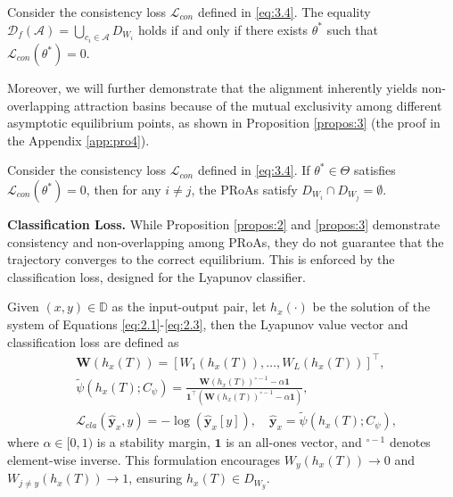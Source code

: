 \documentclass[journal]{IEEEtran}
\begin{document}
\begin{proposition} \label{propos:2}
	Consider the consistency loss $\mathcal{L}_{con}$ defined in \eqref{eq:3.4}. The equality $\mathcal{D}_{f}(\mathcal{A}) = \bigcup_{c_i \in \mathcal{A}} D_{W_i}$ holds if and only if there exists $\theta^*$ such that $\mathcal{L}_{con}(\theta^*) = 0$.
\end{proposition}

Moreover, we will further demonstrate that the alignment inherently yields non-overlapping attraction basins because of the mutual exclusivity among different asymptotic equilibrium points, as shown in Proposition \ref{propos:3} (the proof in the Appendix \ref{app:pro4}).

\begin{proposition} \label{propos:3}
	Consider the consistency loss $\mathcal{L}_{con}$ defined in \eqref{eq:3.4}. If $\theta^* \in \Theta$ satisfies $\mathcal{L}_{con}(\theta^*) = 0$, then for any $i \neq j$, the PRoAs satisfy $D_{W_i} \cap D_{W_j} = \emptyset$.
\end{proposition}

\vspace{\baselineskip} 
\noindent  \textbf{Classification Loss.} 
While Proposition \ref{propos:2} and \ref{propos:3} demonstrate consistency and non-overlapping among PRoAs, they do not guarantee that the trajectory converges to the correct equilibrium. This is enforced by the classification loss, designed for the Lyapunov classifier. 

Given $(x,y) \in \mathbb{D}$ as the input-output pair, let $h_x( \cdot)$ be the solution of the system of Equations \eqref{eq:2.1}-\eqref{eq:2.3}, then the Lyapunov value vector and classification loss are defined as
\begin{align*}
	& \mathbf{W}(h_x(T)) = \left[ W_1(h_x(T)), \dots, W_L(h_x(T)) \right]^\top ,\\
	& \tilde \psi \left( {{h_x}\left( T \right);{C_\psi }} \right) = \frac{ \mathbf{W}(h_x(T))^{\circ -1} - \alpha \mathbf{1} }{ \mathbf{1}^\top \left( \mathbf{W}(h_x(T))^{\circ -1} - \alpha \mathbf{1} \right) } ,\\
	& \mathcal{L}_{cla}(\hat{\mathbf{y}}_x, y) = -\log \left( \hat{\mathbf{y}}_x[y] \right), \quad  \hat{\mathbf{y}}_x = \tilde  \psi \left( {h_{x}\left( T \right);{C _\psi }} \right),
\end{align*}
where $\alpha \in [0,1)$ is a stability margin, $\mathbf{1}$ is an all-ones vector, and $^{\circ -1}$ denotes element-wise inverse. This formulation encourages $W_y(h_x(T)) \to 0$ and $W_{j\neq y}(h_x(T)) \to 1$, ensuring $h_x(T) \in D_{W_y}$. 
\end{document}
